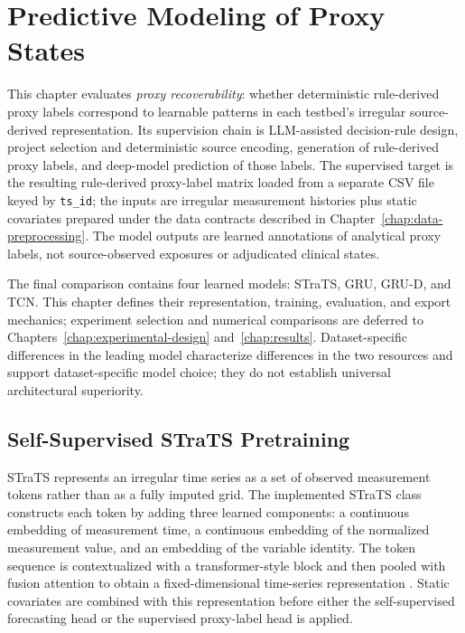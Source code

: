 \chapter{Predictive Modeling of Proxy States}
\label{chap:predictive-modeling-proxy-states}

This chapter evaluates \emph{proxy recoverability}: whether deterministic rule-derived proxy labels correspond to learnable patterns in each testbed's irregular source-derived representation.  Its supervision chain is LLM-assisted decision-rule design, project selection and deterministic source encoding, generation of rule-derived proxy labels, and deep-model prediction of those labels.  The supervised target is the resulting rule-derived proxy-label matrix loaded from a separate CSV file keyed by \texttt{ts\_id}; the inputs are irregular measurement histories plus static covariates prepared under the data contracts described in Chapter~\ref{chap:data-preprocessing}.  The model outputs are learned annotations of analytical proxy labels, not source-observed exposures or adjudicated clinical states.

The final comparison contains four learned models: STraTS, GRU, GRU-D, and TCN.  This chapter defines their representation, training, evaluation, and export mechanics; experiment selection and numerical comparisons are deferred to Chapters~\ref{chap:experimental-design} and~\ref{chap:results}.  Dataset-specific differences in the leading model characterize differences in the two resources and support dataset-specific model choice; they do not establish universal architectural superiority.

\section{Self-Supervised STraTS Pretraining}
\label{sec:predictive-modeling-proxy-states:self-supervised-strats-pretraining}

STraTS represents an irregular time series as a set of observed measurement tokens rather than as a fully imputed grid.  The implemented STraTS class constructs each token by adding three learned components: a continuous embedding of measurement time, a continuous embedding of the normalized measurement value, and an embedding of the variable identity.  The token sequence is contextualized with a transformer-style block and then pooled with fusion attention to obtain a fixed-dimensional time-series representation \cite{tipirneni2022strats}.  Static covariates are combined with this representation before either the self-supervised forecasting head or the supervised proxy-label head is applied.

